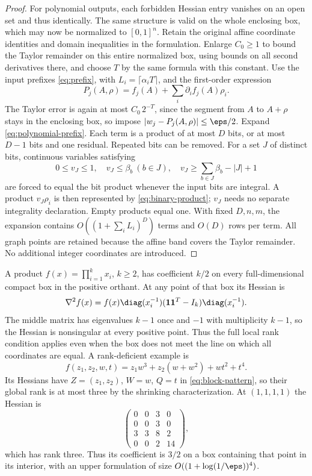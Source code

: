 \begin{proof}
For polynomial outputs, each forbidden Hessian entry vanishes on an
open set and thus identically. The same structure is valid on the
whole enclosing box, which may now be normalized to $[0,1]^n$.
Retain the original affine coordinate identities and domain
inequalities in the formulation. Enlarge $C_0\ge1$ to bound the Taylor
remainder on this entire normalized box, using bounds on all second
derivatives there, and choose $T$ by the same formula with this constant.
Use the input prefixes \eqref{eq:prefix}, with
$L_i=\lceil\alpha_iT\rceil$, and the first-order expression
\begin{equation}\label{eq:polynomial-prefix}
 P_j(A,\rho)=f_j(A)+\sum_i\partial_i f_j(A)\rho_i.
\end{equation}
The Taylor error is again at most $C_0\,2^{-T}$, since the segment
from $A$ to $A+\rho$ stays in the enclosing box, so impose
$|w_j-P_j(A,\rho)|\le\eps/2$. Expand \eqref{eq:polynomial-prefix}.
Each term is a product of at most $D$ bits, or at most $D-1$ bits and
one residual. Repeated bits can be removed. For a set $J$ of distinct
bits, continuous variables satisfying
\[
 0\le v_J\le1,\quad v_J\le\beta_b\ (b\in J),\quad
 v_J\ge\sum_{b\in J}\beta_b-|J|+1
\]
are forced to equal the bit product whenever the input bits are integral.
A product $v_J\rho_i$ is then represented by
\eqref{eq:binary-product}; $v_J$ needs no separate integrality declaration.
Empty products equal one. With fixed $D,n,m$, the expansion contains
$O((1+\sum_iL_i)^D)$ terms and $O(D)$ rows per term. All graph points
are retained because the affine band covers the Taylor remainder.
No additional integer coordinates are introduced.
\end{proof}

A product $f(x)=\prod_{i=1}^k x_i$, $k\ge2$, has coefficient $k/2$
on every full-dimensional compact box in the positive orthant. At any
point of that box its Hessian is
\[
 \nabla^2f(x)=f(x)\diag(x_i^{-1})
                 (\mathbf1\mathbf1^T-I_k)\diag(x_i^{-1}).
\]
The middle matrix has eigenvalues $k-1$ once and $-1$ with multiplicity
$k-1$, so the Hessian is nonsingular at every positive point. Thus the
full local rank condition applies even when the box does not meet the
line on which all coordinates are equal.
A rank-deficient example is
\[
 f(z_1,z_2,w,t)=z_1w^3+z_2(w+w^2)+wt^2+t^4.
\]
Its Hessians have $Z=(z_1,z_2)$, $W=w$, $Q=t$ in
\eqref{eq:block-pattern}, so their global rank is at most three by the
shrinking characterization. At $(1,1,1,1)$ the Hessian is
\[
 \begin{pmatrix}0&0&3&0\\0&0&3&0\\3&3&8&2\\0&0&2&14\end{pmatrix},
\]
which has rank three. Thus its coefficient is $3/2$ on a box containing
that point in its interior, with an upper formulation of size
$O((1+\log(1/\eps))^4)$.

